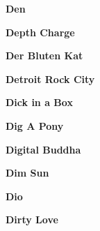 \vspace{10pt} 
\begin{center}\textbf{Den}\end{center}
\newline
\vspace{10pt} 
\begin{center}\textbf{Depth Charge}\end{center}
\newline
\vspace{10pt} 
\begin{center}\textbf{Der Bluten Kat}\end{center}
\newline
\vspace{10pt} 
\begin{center}\textbf{Detroit Rock City}\end{center}
\newline
\vspace{10pt} 
\begin{center}\textbf{Dick in a Box}\end{center}
\newline
\vspace{10pt} 
\begin{center}\textbf{Dig A Pony}\end{center}
\newline
\vspace{10pt} 
\begin{center}\textbf{Digital Buddha}\end{center}
\newline
\vspace{10pt} 
\begin{center}\textbf{Dim Sun}\end{center}
\newline
\vspace{10pt} 
\begin{center}\textbf{Dio}\end{center}
\newline
\vspace{10pt} 
\begin{center}\textbf{Dirty Love}\end{center}
\newline
